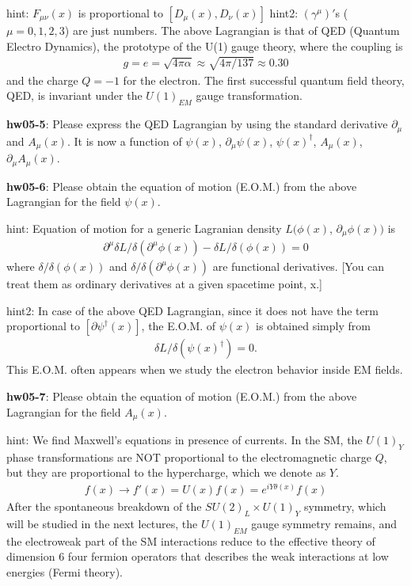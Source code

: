 \documentclass[12pt]{article}
\def\del{{\partial}}
\begin{document}
  hint: $F_{\mu\nu}(x)$ is proportional to $[ D_\mu(x), D_\nu(x) ]$
  hint2: $(\gamma^\mu)'$s ($\mu = 0,1,2,3$) are just numbers.
  The above Lagrangian is that of QED (Quantum Electro Dynamics),
  the prototype of the U(1) gauge theory, where the coupling is
\begin{eqnarray}
    g = e = \sqrt{4\pi\alpha} \approx \sqrt{4\pi/137} \approx 0.30
\end{eqnarray}
  and the charge $Q = -1$ for the electron.  The first successful
  quantum field theory, QED, is invariant under the $U(1)_{EM}$
  gauge transformation.

{\bf hw05-5}:
  Please express the QED Lagrangian by using the standard
  derivative $\del_\mu$ and $A_\mu(x)$.  It is now a function of
  $\psi(x)$, $\del_\mu \psi(x)$, $\psi(x)^\dagger$, $A_\mu(x)$, $\del_\mu A_\mu(x)$.

{\bf hw05-6}:
  Please obtain the equation of motion (E.O.M.) from the above
  Lagrangian for the field $\psi(x)$.

  hint: Equation of motion for a generic Lagranian density
  $L(\phi(x)$, $\del_\mu\phi(x))$
  is
\begin{eqnarray}
    \del^\mu \delta L/\delta(\del^\mu\phi(x))
    - \delta L/\delta(\phi(x))
    = 0
\end{eqnarray}
  where $\delta/\delta(\phi(x))$ and
  $\delta/\delta(\del^\mu\phi(x))$ are functional derivatives.
  [You can treat them as ordinary derivatives at a given
  spacetime point, x.]

  hint2:
  In case of the above QED Lagrangian, since it does not have
  the term proportional to $[\del \psi^\dagger(x)]$, the E.O.M.
  of $\psi(x)$ is obtained simply from
\begin{eqnarray}
    \delta L/\delta(\psi(x)^\dagger) = 0.
\end{eqnarray}
 This E.O.M. often appears when we study the electron behavior
  inside EM fields.

{\bf hw05-7}:
  Please obtain the equation of motion (E.O.M.) from the above
  Lagrangian for the field $A_\mu(x)$.

  hint: We find Maxwell's equations in presence of currents.
  In the SM, the $U(1)_Y$ phase transformations are NOT proportional
  to the electromagnetic charge $Q$, but they are proportional to
  the hypercharge, which we denote as $Y$.
\begin{eqnarray}
    f(x) \to f'(x) = U(x) f(x) = e^{i Y \theta(x)} f(x) 
\end{eqnarray}
  After the spontaneous breakdown of the $SU(2)_L \times U(1)_Y$
  symmetry, which will be studied in the next lectures, the
  $U(1)_{EM}$ gauge symmetry remains, and the electroweak part of
  the SM interactions reduce to the effective theory of dimension
  6 four fermion operators that describes the weak interactions
  at low energies (Fermi theory).
\end{document}
